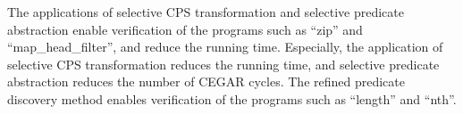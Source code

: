 
The applications of selective CPS transformation and selective predicate 
abstraction enable verification of the programs such as ``zip'' and 
``map\_head\_filter'', and reduce the running time.  Especially, the 
application of selective CPS transformation reduces the running time, 
and selective predicate abstraction reduces the number of CEGAR cycles. 
The refined predicate discovery method enables verification of the 
programs such as ``length'' and ``nth''.

